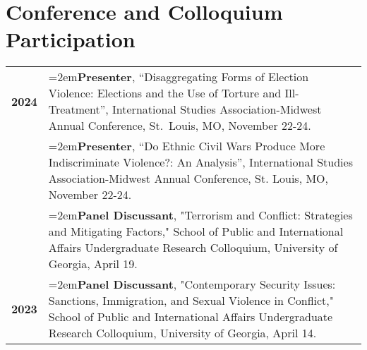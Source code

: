 \documentclass[letterpaper,12pt]{article}
\begin{document}
\section{Conference and Colloquium Participation}
\begin{xltabular}{\dimexpr\textwidth-0in}{p{.85in}X}
\textbf{2024} & \hangindent=2em\textbf{Presenter}, ``Disaggregating Forms of Election Violence: Elections and the Use of Torture and Ill-Treatment”, International Studies Association-Midwest Annual Conference, \mbox{St. Louis}, MO, November 22-24.\\
                     & \hangindent=2em\textbf{Presenter}, ``Do Ethnic Civil Wars Produce More Indiscriminate Violence?: An \mbox{Analysis}”, International Studies Association-Midwest Annual Conference, St. Louis, MO, \mbox{November} 22-24.\\
                     & \hangindent=2em\textbf{Panel Discussant}, "Terrorism and Conflict: Strategies and Mitigating Factors," School of Public and International Affairs Undergraduate Research Colloquium, University of Georgia, April 19.\\ 
\textbf{2023} &  \hangindent=2em\textbf{Panel Discussant}, "Contemporary Security Issues: Sanctions, Immigration, and \mbox{Sexual} \mbox{Violence} in Conflict," School of Public and International Affairs Undergraduate \mbox{Research} \mbox{Colloquium,} University of Georgia, April 14.\\ 
\end{xltabular}

\end{document}
